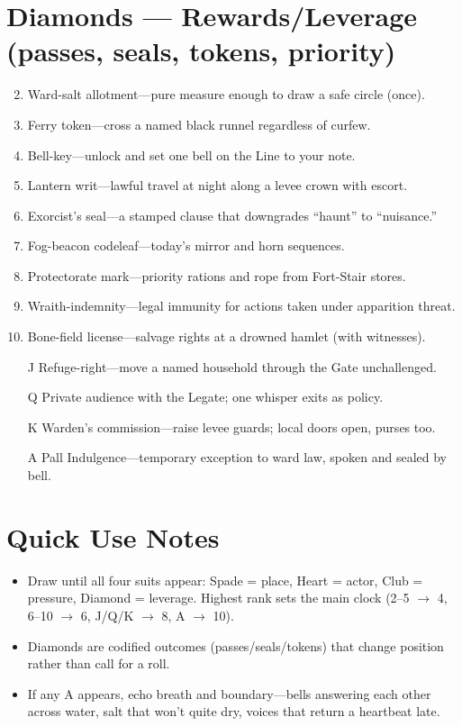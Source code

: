 \section*{Diamonds --- Rewards/Leverage (passes, seals, tokens, priority)}
\label{sec:mistlands-rewards}
\begin{enumerate}
\setcounter{enumi}{1}
\item Ward-salt allotment---pure measure enough to draw a safe circle (once).
\item Ferry token---cross a named black runnel regardless of curfew.
\item Bell-key---unlock and set one bell on the Line to your note.
\item Lantern writ---lawful travel at night along a levee crown with escort.
\item Exorcist's seal---a stamped clause that downgrades ``haunt'' to ``nuisance.''
\item Fog-beacon codeleaf---today's mirror and horn sequences.
\item Protectorate mark---priority rations and rope from Fort-Stair stores.
\item Wraith-indemnity---legal immunity for actions taken under apparition threat.
\item Bone-field license---salvage rights at a drowned hamlet (with witnesses).
\item[J] Refuge-right---move a named household through the Gate unchallenged.
\item[Q] Private audience with the Legate; one whisper exits as policy.
\item[K] Warden's commission---raise levee guards; local doors open, purses too.
\item[A] Pall Indulgence---temporary exception to ward law, spoken and sealed by bell.
\end{enumerate}

\section*{Quick Use Notes}
\label{sec:mistlands-quick-use}
\begin{itemize}
\item Draw until all four suits appear: Spade = place, Heart = actor, Club = pressure, Diamond = leverage. Highest rank sets the main clock (2--5 $\rightarrow$ 4, 6--10 $\rightarrow$ 6, J/Q/K $\rightarrow$ 8, A $\rightarrow$ 10).
\item Diamonds are codified outcomes (passes/seals/tokens) that change position rather than call for a roll.
\item If any A appears, echo breath and boundary---bells answering each other across water, salt that won’t quite dry, voices that return a heartbeat late.
\end{itemize}

